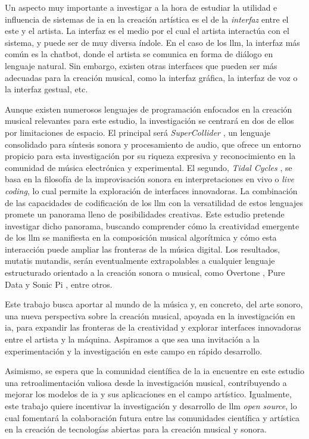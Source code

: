 Un aspecto muy importante a investigar a la hora de estudiar la utilidad e influencia de sistemas de \gls{ia} en la creación artística es el de la \emph{interfaz} entre el este y el artista. La interfaz es el medio por el cual el artista interactúa con el sistema, y puede ser de muy diversa índole. En el caso de los \gls{llm}, la interfaz más común es la {chatbot}, donde el artista se comunica en forma de diálogo en lenguaje natural. Sin embargo, existen otras interfaces que pueden ser más adecuadas para la creación musical, como la interfaz gráfica, la interfaz de voz o la interfaz gestual, etc.

Aunque existen numerosos lenguajes de programación enfocados en la creación musical relevantes para este estudio, la investigación se centrará en dos de ellos por limitaciones de espacio. El principal será \emph{SuperCollider} \cite{SupercolliderSupercollider2024}, un lenguaje consolidado para síntesis sonora y procesamiento de audio, que ofrece un entorno propicio para esta investigación por su riqueza expresiva y reconocimiento en la comunidad de música electrónica y experimental. El segundo, \emph{Tidal Cycles} \citep{LiveCodeTidal}, se basa en la filosofía de la improvisación sonora en interpretaciones en vivo o \emph{live coding}, lo cual permite la exploración de interfaces innovadoras. La combinación de las capacidades de codificación de los \gls{llm} con la versatilidad de estos lenguajes promete un panorama lleno de posibilidades creativas. Este estudio pretende investigar dicho panorama, buscando comprender cómo la creatividad emergente de los \gls{llm} se manifiesta en la composición musical algorítmica y cómo esta interacción puede ampliar las fronteras de la música digital. Los resultados, mutatis mutandis, serán eventualmente extrapolables a cualquier lenguaje estructurado orientado a la creación sonora o musical, como {Overtone} \citep{OvertoneCollaborativeProgrammable}, {Pure Data} \citep{PureDataPd} y {Sonic Pi} \citep{SonicPiLive}, entre otros.

Este trabajo busca aportar al mundo de la música y, en concreto, del arte sonoro, una nueva perspectiva sobre la creación musical, apoyada en la investigación en \gls{ia}, para expandir las fronteras de la creatividad y explorar interfaces innovadoras entre el artista y la máquina. Aspiramos a que sea una invitación a la experimentación y la investigación en este campo en rápido desarrollo.

Asimismo, se espera que la comunidad científica de la \gls{ia} encuentre en este estudio una retroalimentación valiosa desde la investigación musical, contribuyendo a mejorar los modelos de \gls{ia} y sus aplicaciones en el campo artístico. Igualmente, este trabajo quiere incentivar la investigación y desarrollo de \gls{llm} \emph{open source}, lo cual fomentará la colaboración futura entre las comunidades científica y artística en la creación de tecnologías abiertas para la creación musical y sonora.